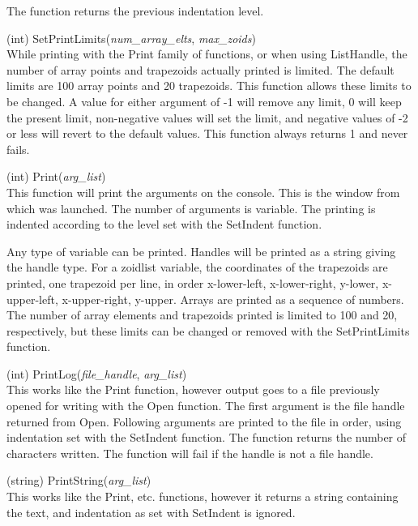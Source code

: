 \begin{description}
The function returns the previous indentation level.

\item{(int) \vt SetPrintLimits({\it num\_array\_elts}, {\it max\_zoids\/})}\\
While printing with the {\vt Print} family of functions, or when using
{\vt ListHandle}, the number of array points and trapezoids actually
printed is limited.  The default limits are 100 array points and 20
trapezoids.  This function allows these limits to be changed.  A value
for either argument of -1 will remove any limit, 0 will keep the
present limit, non-negative values will set the limit, and negative
values of -2 or less will revert to the default values.  This function
always returns 1 and never fails.

\item{(int) \vt Print({\it arg\_list\/})}\\
This function will print the arguments on the console.  This is the
window from which {\Xic} was launched.  The number of arguments is
variable.  The printing is indented according to the level set with
the {\vt SetIndent} function.

Any type of variable can be printed.  Handles will be printed as a
string giving the handle type.  For a zoidlist variable, the
coordinates of the trapezoids are printed, one trapezoid per line, in
order x-lower-left, x-lower-right, y-lower, x-upper-left,
x-upper-right, y-upper.  Arrays are printed as a sequence of numbers. 
The number of array elements and trapezoids printed is limited to 100
and 20, respectively, but these limits can be changed or removed with
the {\vt SetPrintLimits} function.

\item{(int) \vt PrintLog({\it file\_handle\/}, {\it arg\_list\/})}\\
This works like the {\vt Print} function, however output goes to a
file previously opened for writing with the {\vt Open} function.  The
first argument is the file handle returned from {\vt Open}.  Following
arguments are printed to the file in order, using indentation set with
the {\vt SetIndent} function.  The function returns the number of
characters written.  The function will fail if the handle is not a
file handle.

\item{(string) \vt PrintString({\it arg\_list\/})}\\
This works like the {\vt Print}, etc.  functions, however it returns a
string containing the text, and indentation as set with {\vt
SetIndent} is ignored.


\end{description}
